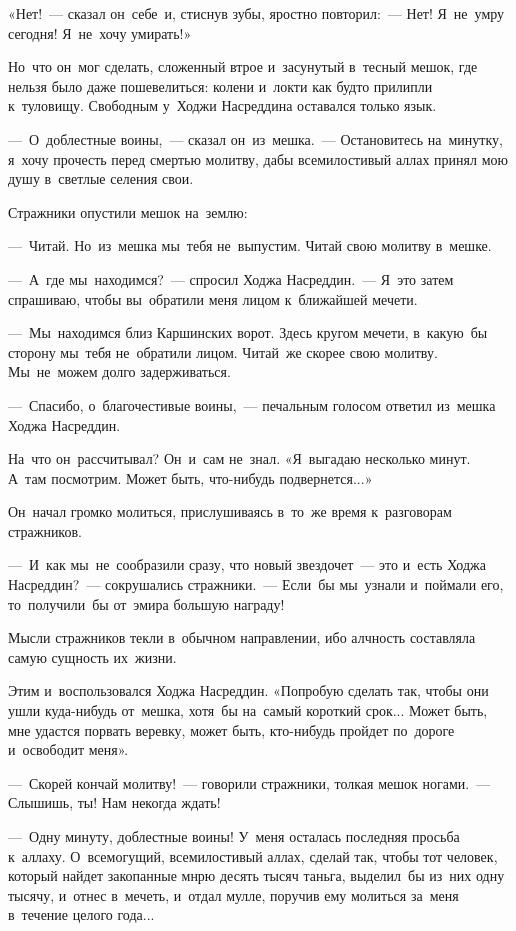 \documentclass[12pt,a4paper]{book}
\begin{document}
«Нет!~— сказал он~себе~и, стиснув зубы, яростно повторил:~— Нет! Я~не~умру сегодня! Я~не~хочу умирать!»

Но~что он~мог сделать, сложенный втрое и~засунутый в~тесный мешок, где нельзя было даже пошевелиться: колени и~локти как будто прилипли к~туловищу. Свободным у~Ходжи Насреддина оставался только язык.

—~О~доблестные воины,~— сказал он~из~мешка.~— Остановитесь на~минутку, я~хочу прочесть перед смертью молитву, дабы всемилостивый аллах принял мою душу в~светлые селения свои.

Стражники опустили мешок на~землю:

—~Читай. Но~из~мешка мы~тебя не~выпустим. Читай свою молитву в~мешке.

—~А~где мы~находимся?~— спросил Ходжа Насреддин.~— Я~это затем спрашиваю, чтобы вы~обратили меня лицом к~ближайшей мечети.

—~Мы~находимся близ Каршинских ворот. Здесь кругом мечети, в~какую~бы сторону мы~тебя не~обратили лицом. Читай~же скорее свою молитву. Мы~не~можем долго задерживаться.

—~Спасибо, о~благочестивые воины,~— печальным голосом ответил из~мешка Ходжа Насреддин.

На~что он~рассчитывал? Он~и~сам не~знал. «Я~выгадаю несколько минут. А~там посмотрим. Может быть, что-нибудь подвернется...»

Он~начал громко молиться, прислушиваясь в~то~же время к~разговорам стражников.

—~И~как мы~не~сообразили сразу, что новый звездочет~— это и~есть Ходжа Насреддин?~— сокрушались стражники.~— Если~бы мы~узнали и~поймали его, то~получили~бы от~эмира большую награду!

Мысли стражников текли в~обычном направлении, ибо алчность составляла самую сущность их~жизни.

Этим и~воспользовался Ходжа Насреддин. «Попробую сделать так, чтобы они ушли куда-нибудь от~мешка, хотя~бы на~самый короткий срок... Может быть, мне удастся порвать веревку, может быть, кто-нибудь пройдет по~дороге и~освободит меня».

—~Скорей кончай молитву!~— говорили стражники, толкая мешок ногами.~— Слышишь, ты! Нам некогда ждать!

—~Одну минуту, доблестные воины! У~меня осталась последняя просьба к~аллаху. О~всемогущий, всемилостивый аллах, сделай так, чтобы тот человек, который найдет закопанные мнрю десять тысяч таньга, выделил~бы из~них одну тысячу, и~отнес в~мечеть, и~отдал мулле, поручив ему молиться за~меня в~течение целого года...
\end{document}
